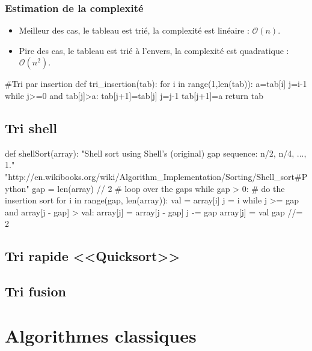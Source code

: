 \documentclass[10pt]{article}
\begin{document}
\subsubsection*{Estimation de la complexité}
\begin{itemize}
\item Meilleur des cas, le tableau est trié, la complexité est linéaire : $\mathcal{O}(n)$.
\item Pire des cas, le tableau est trié à l'envers, la complexité est quadratique : $\mathcal{O}(n^2)$.
\end{itemize}



\begin{py}
\begin{python}    
#Tri par insertion
def tri_insertion(tab):
    for i in range(1,len(tab)):
        a=tab[i] 
        j=i-1    
        while j>=0 and tab[j]>a:
            tab[j+1]=tab[j]
            j=j-1
        tab[j+1]=a
    return tab
\end{python}
\end{py}

\subsection{Tri shell}
\begin{py}
\begin{python}
def shellSort(array):
     "Shell sort using Shell's (original) gap sequence: n/2, n/4, ..., 1."
     "http://en.wikibooks.org/wiki/Algorithm_Implementation/Sorting/Shell_sort#Python"
     gap = len(array) // 2
     # loop over the gaps
     while gap > 0:
         # do the insertion sort
         for i in range(gap, len(array)):
             val = array[i]
             j = i
             while j >= gap and array[j - gap] > val:
                 array[j] = array[j - gap]
                 j -= gap
             array[j] = val
         gap //= 2
\end{python}
\end{py}

\subsection{Tri rapide <<Quicksort>>}
\subsection{Tri fusion}

\section{Algorithmes classiques}
\end{document}
